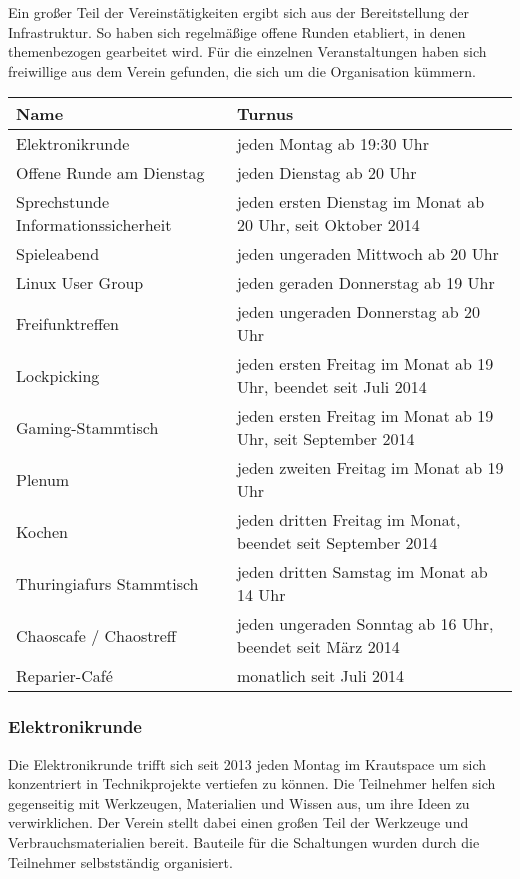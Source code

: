 \documentclass[10pt,DIV16]{scrartcl}
\begin{document}
Ein großer Teil der Vereinstätigkeiten ergibt sich aus der
Bereitstellung der Infrastruktur. So haben sich regelmäßige offene Runden
etabliert, in denen themenbezogen gearbeitet wird. Für die
einzelnen Veranstaltungen haben sich freiwillige aus dem Verein
gefunden, die sich um die Organisation kümmern.

\begin{table}[h]
	\begin{tabular}{l|l}
		Name & Turnus \\ \hline
		Elektronikrunde & jeden Montag ab 19:30 Uhr\\
		Offene Runde am Dienstag & jeden Dienstag ab 20 Uhr\\
		Sprechstunde Informationssicherheit & jeden ersten Dienstag im Monat ab 20 Uhr, seit Oktober 2014\\ 
		Spieleabend & jeden ungeraden Mittwoch ab 20 Uhr\\
		Linux User Group & jeden geraden Donnerstag ab 19 Uhr\\
		Freifunktreffen & jeden ungeraden Donnerstag ab 20 Uhr\\
		Lockpicking & jeden ersten Freitag im Monat ab 19 Uhr, beendet seit Juli 2014\\
		Gaming-Stammtisch & jeden ersten Freitag im Monat ab 19 Uhr, seit September 2014\\
		Plenum & jeden zweiten Freitag im Monat ab 19 Uhr\\
		Kochen & jeden dritten Freitag im Monat, beendet seit September 2014\\
		Thuringiafurs Stammtisch & jeden dritten Samstag im Monat ab 14 Uhr\\
		Chaoscafe / Chaostreff & jeden ungeraden Sonntag ab 16 Uhr, beendet seit März 2014\\
		Reparier-Café & monatlich seit Juli 2014\\
\end{tabular}
\end{table}

\subsubsection{Elektronikrunde}

Die Elektronikrunde trifft sich seit 2013 jeden Montag im Krautspace um
sich konzentriert in Technikprojekte vertiefen zu können. Die
Teilnehmer helfen sich gegenseitig mit Werkzeugen, Materialien und
Wissen aus, um ihre Ideen zu verwirklichen. Der Verein stellt dabei
einen großen Teil der Werkzeuge und Verbrauchsmaterialien bereit.
Bauteile für die Schaltungen wurden durch die Teilnehmer selbstständig
organisiert.
\end{document}
